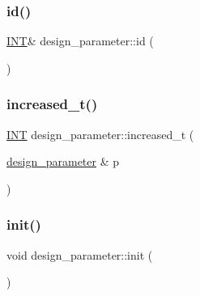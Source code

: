 \mbox{\label{classdesign__parameter_ae83312a3e4d40a0ce15b649d3fe3ff19}} 
\subsubsection{\texorpdfstring{id()}{id()}}
{\footnotesize\ttfamily \mbox{\hyperlink{galois_8h_a09fddde158a3a20bd2dcadb609de11dc}{I\+NT}}\& design\+\_\+parameter\+::id (\begin{DoxyParamCaption}{ }\end{DoxyParamCaption})\hspace{0.3cm}{\ttfamily [inline]}}

\mbox{\label{classdesign__parameter_a8f39a90927d51e3cb3772bc98c94d7d0}} 
\subsubsection{\texorpdfstring{increased\+\_\+t()}{increased\_t()}}
{\footnotesize\ttfamily \mbox{\hyperlink{galois_8h_a09fddde158a3a20bd2dcadb609de11dc}{I\+NT}} design\+\_\+parameter\+::increased\+\_\+t (\begin{DoxyParamCaption}\item[{\mbox{\hyperlink{classdesign__parameter}{design\+\_\+parameter}} \&}]{p }\end{DoxyParamCaption})}

\mbox{\label{classdesign__parameter_af77829be8d9058a84169c36143307b5d}} 
\subsubsection{\texorpdfstring{init()}{init()}\hspace{0.1cm}{\footnotesize\ttfamily [1/3]}}
{\footnotesize\ttfamily void design\+\_\+parameter\+::init (\begin{DoxyParamCaption}{ }\end{DoxyParamCaption})}

